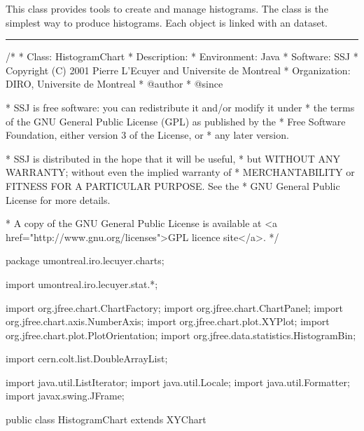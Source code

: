 
This class provides tools to create and manage histograms.
The  class is the simplest way to produce histograms.
Each  object is linked with an
 dataset.

\bigskip\hrule
\begin{code}
\begin{hide}
/*
 * Class:        HistogramChart
 * Description:
 * Environment:  Java
 * Software:     SSJ
 * Copyright (C) 2001  Pierre L'Ecuyer and Universite de Montreal
 * Organization: DIRO, Universite de Montreal
 * @author
 * @since

 * SSJ is free software: you can redistribute it and/or modify it under
 * the terms of the GNU General Public License (GPL) as published by the
 * Free Software Foundation, either version 3 of the License, or
 * any later version.

 * SSJ is distributed in the hope that it will be useful,
 * but WITHOUT ANY WARRANTY; without even the implied warranty of
 * MERCHANTABILITY or FITNESS FOR A PARTICULAR PURPOSE.  See the
 * GNU General Public License for more details.

 * A copy of the GNU General Public License is available at
   <a href="http://www.gnu.org/licenses">GPL licence site</a>.
 */
\end{hide}
package umontreal.iro.lecuyer.charts;\begin{hide}

import   umontreal.iro.lecuyer.stat.*;

import   org.jfree.chart.ChartFactory;
import   org.jfree.chart.ChartPanel;
import   org.jfree.chart.axis.NumberAxis;
import   org.jfree.chart.plot.XYPlot;
import   org.jfree.chart.plot.PlotOrientation;
import   org.jfree.data.statistics.HistogramBin;

import   cern.colt.list.DoubleArrayList;

import   java.util.ListIterator;
import   java.util.Locale;
import   java.util.Formatter;
import   javax.swing.JFrame;\end{hide}

public class HistogramChart extends XYChart \begin{hide} {

}
\end{hide}
\end{code}
